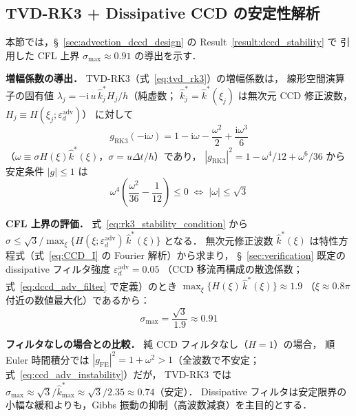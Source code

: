 %

\subsection{TVD-RK3 + Dissipative CCD の安定性解析}
\label{app:stability_derivation}

本節では，§~\ref{sec:advection_dccd_design} の Result~\ref{result:dccd_stability} で
引用した CFL 上界 $\sigma_{\max} \approx 0.91$ の導出を示す．

\medskip
\noindent\textbf{増幅係数の導出．}
TVD-RK3（式~\eqref{eq:tvd_rk3}）の増幅係数は，
線形空間演算子の固有値 $\lambda_j = -\mathrm{i}\,u\,\hat{k}^*_j H_j/h$（純虚数；
$\hat{k}^*_j = \hat{k}^*(\xi_j)$ は無次元 CCD 修正波数，$H_j \equiv H(\xi_j;\varepsilon_d^{\mathrm{adv}})$）
に対して
\[
  g_{\mathrm{RK3}}(-\mathrm{i}\omega) = 1-\mathrm{i}\omega - \frac{\omega^2}{2} + \frac{\mathrm{i}\omega^3}{6}
\]
（$\omega \equiv \sigma H(\xi)\hat{k}^*(\xi)$，$\sigma=u\Delta t/h$）であり，
$|g_{\mathrm{RK3}}|^2 = 1 - \omega^4/12 + \omega^6/36$
から安定条件 $|g| \leq 1$ は
\begin{equation}
  \omega^4\!\left(\frac{\omega^2}{36} - \frac{1}{12}\right) \leq 0
  \;\Longleftrightarrow\;
  |\omega| \leq \sqrt{3}
  \label{eq:rk3_stability_condition}
\end{equation}

\medskip
\noindent\textbf{CFL 上界の評価．}
式~\eqref{eq:rk3_stability_condition} から
$\sigma \leq \sqrt{3}/\max_\xi\bigl\{H(\xi;\varepsilon_d^{\mathrm{adv}})\,\hat{k}^*(\xi)\bigr\}$ となる．
無次元修正波数 $\hat{k}^*(\xi)$ は特性方程式（式~\eqref{eq:CCD_I} の Fourier 解析）から求まり，
§~\ref{sec:verification} 既定の dissipative フィルタ強度 $\varepsilon_d^{\mathrm{adv}} = 0.05$
（CCD 移流再構成の散逸係数；式~\eqref{eq:dccd_adv_filter} で定義）のとき
$\max_\xi\{H(\xi)\,\hat{k}^*(\xi)\} \approx 1.9$
（$\xi \approx 0.8\pi$ 付近の数値最大化）であるから：
\[
  \sigma_{\max} = \frac{\sqrt{3}}{1.9} \approx 0.91
\]

\medskip
\noindent\textbf{フィルタなしの場合との比較．}
純 CCD フィルタなし（$H=1$）の場合，
順 Euler 時間積分では $|g_\text{FE}|^2 = 1+\omega^2 > 1$（全波数で不安定；式~\eqref{eq:ccd_adv_instability}）だが，
TVD-RK3 では $\sigma_{\max} \approx \sqrt{3}/\hat{k}^*_{\max} \approx \sqrt{3}/2.35 \approx 0.74$（安定）．
Dissipative フィルタは安定限界の小幅な緩和よりも，Gibbs 振動の抑制（高波数減衰）を主目的とする．
